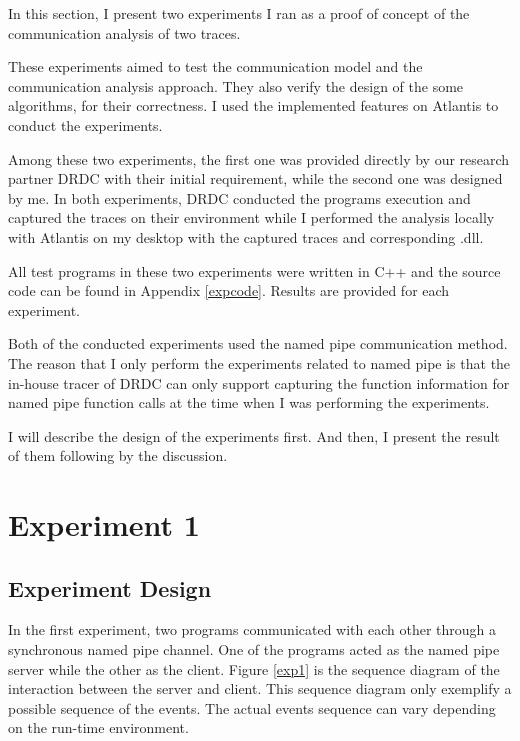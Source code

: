 


\label{chapter:Exp}
In this section, I present two experiments I ran as a proof of concept of the communication analysis of two traces.

These experiments aimed to test the communication model and the communication analysis approach. They also verify the design of the some algorithms, for their correctness. I used the implemented features on Atlantis to conduct the experiments.

Among these two experiments, the first one was provided directly by our research partner DRDC with their initial requirement, while the second one was designed by me. In both experiments, DRDC conducted the programs execution and captured the traces on their environment while I performed the analysis locally with Atlantis on my desktop with the captured traces and corresponding .dll.

All test programs in these two experiments were written in C++ and the source code can be found in Appendix \ref{expcode}. Results are provided for each experiment. 

Both of the conducted experiments used the named pipe communication method. The reason that I only perform the experiments related to named pipe is that the in-house tracer of DRDC can only support capturing the function information for named pipe function calls at the time when I was performing the experiments. 


I will describe the design of the experiments first. And then, I present the result of them following by the discussion.

\section{Experiment 1}
\subsection{Experiment Design}
In the first experiment, two programs communicated with each other through a synchronous named pipe channel. One of the programs acted as the named pipe server while the other as the client. Figure \ref{exp1} is the sequence diagram of the interaction between the server and client. This sequence diagram only exemplify a possible sequence of the events. The actual events sequence can vary depending on the run-time environment. 


